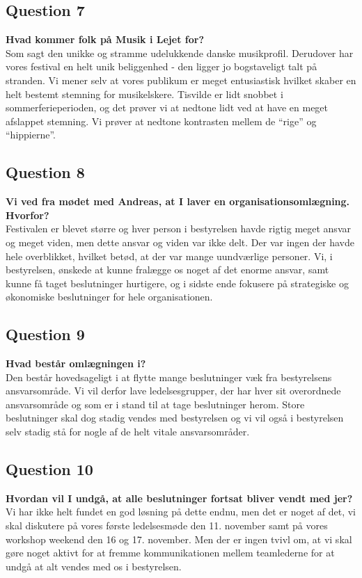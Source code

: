 \subsection{Question 7}
\label{i2q7}
\noindent \textbf{Hvad kommer folk på Musik i Lejet for?} \\
Som sagt den unikke og stramme udelukkende danske musikprofil. Derudover har vores festival en helt unik beliggenhed - den ligger jo bogstaveligt talt på stranden. Vi mener selv at vores publikum er meget entusiastisk hvilket skaber en helt bestemt stemning for musikelskere. Tisvilde er lidt snobbet i sommerferieperioden, og det prøver vi at nedtone lidt ved at have en meget afslappet stemning. Vi prøver at nedtone kontrasten mellem de “rige” og “hippierne”.

\subsection{Question 8}
\label{i2q8}
\noindent \textbf{Vi ved fra mødet med Andreas, at I laver en organisationsomlægning. Hvorfor?} \\
Festivalen er blevet større og hver person i bestyrelsen havde rigtig meget ansvar og meget viden, men dette ansvar og viden var ikke delt. Der var ingen der havde hele overblikket, hvilket betød, at der var mange uundværlige personer. Vi, i bestyrelsen, ønskede at kunne fralægge os noget af det enorme ansvar, samt kunne få taget beslutninger hurtigere, og i sidste ende fokusere på strategiske og økonomiske beslutninger for hele organisationen. 

\subsection{Question 9}
\label{i2q9}
\noindent \textbf{Hvad består omlægningen i?} \\
Den består hovedsageligt i at flytte mange beslutninger væk fra bestyrelsens ansvarsområde. Vi vil derfor lave ledelsesgrupper, der har hver sit overordnede ansvarsområde og som er i stand til at tage beslutninger herom. Store beslutninger skal dog stadig vendes med bestyrelsen og vi vil også i bestyrelsen selv stadig stå for nogle af de helt vitale ansvarsområder. 

\subsection{Question 10}
\label{i2q10}
\noindent \textbf{Hvordan vil I undgå, at alle beslutninger fortsat bliver vendt med jer?} \\
Vi har ikke helt fundet en god løsning på dette endnu, men det er noget af det, vi skal diskutere på vores første ledelsesmøde den 11. november samt på vores workshop weekend den 16 og 17. november. Men der er ingen tvivl om, at vi skal gøre noget aktivt for at fremme kommunikationen mellem teamlederne for at undgå at alt vendes med os i bestyrelsen.

